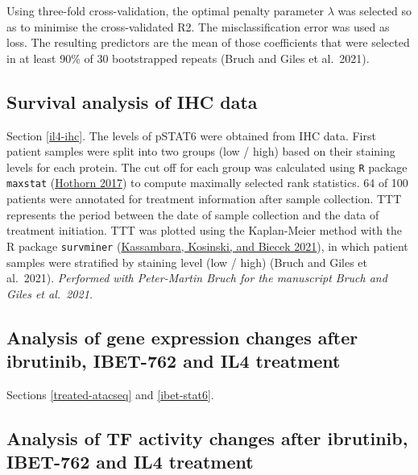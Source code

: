 \documentclass[11pt, a4paper, twosided]{book}
\begin{document}
Using three-fold cross-validation, the optimal penalty parameter \(\lambda\) was selected so as to minimise the cross-validated R2. The misclassification error was used as loss. The resulting predictors are the mean of those coefficients that were selected in at least 90\% of 30 bootstrapped repeats (Bruch and Giles et al.~2021).

\hypertarget{il4-ihc-method}{%
\subsection{Survival analysis of IHC data}\label{il4-ihc-method}}

Section \ref{il4-ihc}. The levels of pSTAT6 were obtained from IHC data. First patient samples were split into two groups (low / high) based on their staining levels for each protein. The cut off for each group was calculated using \texttt{R} package \texttt{maxstat} (\protect\hyperlink{ref-R-maxstat}{Hothorn 2017}) to compute maximally selected rank statistics. 64 of 100 patients were annotated for treatment information after sample collection. TTT represents the period between the date of sample collection and the data of treatment initiation. TTT was plotted using the Kaplan-Meier method with the R package \texttt{survminer} (\protect\hyperlink{ref-R-survminer}{Kassambara, Kosinski, and Biecek 2021}), in which patient samples were stratified by staining level (low / high) (Bruch and Giles et al.~2021). \emph{Performed with Peter-Martin Bruch for the manuscript Bruch and Giles et al.~2021.}

\hypertarget{analysis-of-gene-expression-changes-after-ibrutinib-ibet-762-and-il4-treatment}{%
\subsection{Analysis of gene expression changes after ibrutinib, IBET-762 and IL4 treatment}\label{analysis-of-gene-expression-changes-after-ibrutinib-ibet-762-and-il4-treatment}}

Sections \ref{treated-atacseq} and \ref{ibet-stat6}.

\hypertarget{treated-atacseq-method}{%
\subsection{Analysis of TF activity changes after ibrutinib, IBET-762 and IL4 treatment}\label{treated-atacseq-method}}
\end{document}
